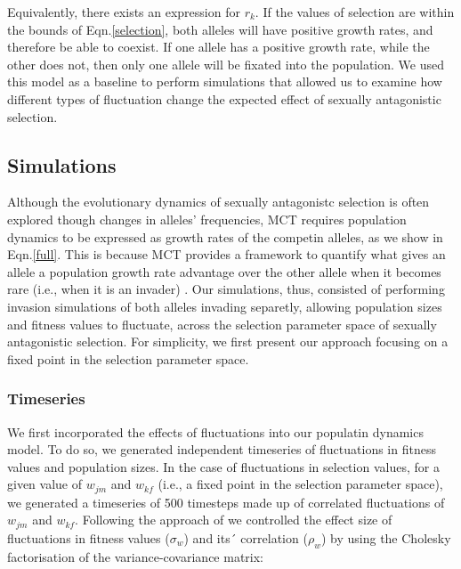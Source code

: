 \documentclass[12pt]{article}
\begin{document}
 Equivalently, there exists an expression for $r_{k}$. If the values of selection are within the bounds of Eqn.\ref{selection}, both alleles will have positive growth rates, and therefore be able to coexist. If one allele has a positive growth rate, while the other does not, then only one allele will be fixated into the population.  We used this model as a baseline to perform simulations that allowed us to examine how different types of fluctuation change the expected effect of sexually antagonistic selection.

\subsection*{Simulations}

Although the evolutionary dynamics of sexually antagonistc selection is often explored though changes in alleles' frequencies, MCT requires population dynamics to be expressed as growth rates of the competin alleles, as we show in Eqn.\ref{full}. This is because MCT provides a framework to quantify what gives an allele a population growth rate advantage over the other allele when it becomes rare (i.e., when it is an invader) \citep{chesson_stabilizing_1982, chesson2003quantifying, barabas_chessons_2018}. Our simulations, thus, consisted of performing  invasion simulations of both alleles invading separetly, allowing population sizes and fitness values to fluctuate, across the selection parameter space of sexually antagonistic selection. For simplicity, we first present our approach focusing on a fixed point in the selection parameter space.


\subsubsection*{Timeseries}

We first incorporated the effects of fluctuations into our populatin dynamics model. To do so, we  generated independent timeseries of fluctuations in fitness values and population sizes. In the case of fluctuations in selection values, for a given value of $w_{jm}$ and $w_{kf}$ (i.e., a fixed point in the selection parameter space), we generated a timeseries of 500 timesteps made up of correlated fluctuations of $w_{jm}$ and $w_{kf}$. Following the approach of  \citet{shoemaker2020} we controlled the effect size of  fluctuations in fitness values ($\sigma_{w}$) and its´ correlation ($\rho_{w}$) by  using the Cholesky factorisation of the variance-covariance matrix:
\end{document}
